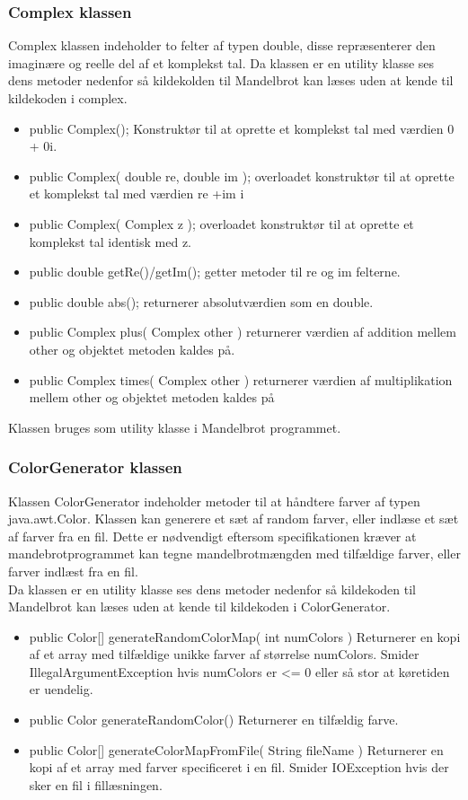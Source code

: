 \subsubsection{Complex klassen}
Complex klassen indeholder to felter af typen double, disse repræsenterer den imaginære og reelle del af et komplekst tal.
Da klassen er en utility klasse ses dens metoder nedenfor så kildekolden til Mandelbrot kan læses uden at kende til kildekoden i complex.
\begin{itemize}
    \item public Complex(); Konstruktør til at oprette et komplekst tal med værdien 0 + 0i.
    \item public Complex( double re, double im ); overloadet konstruktør til at oprette et komplekst tal med værdien re +im i
    \item public Complex( Complex z ); overloadet konstruktør til at oprette et komplekst tal identisk med z.
    \item public double getRe()/getIm(); getter metoder til re og im felterne.
    \item public double abs(); returnerer absolutværdien som en double.
    \item public Complex plus( Complex other ) returnerer værdien af addition mellem other og objektet metoden kaldes på.
    \item public Complex times( Complex other ) returnerer værdien af multiplikation mellem other og objektet metoden kaldes på
\end{itemize}
Klassen bruges som utility klasse i Mandelbrot programmet.

\subsubsection{ColorGenerator klassen}
Klassen ColorGenerator indeholder metoder til at håndtere farver af typen java.awt.Color. Klassen kan generere et
sæt af random farver, eller indlæse et sæt af farver fra en fil. Dette er nødvendigt eftersom specifikationen kræver
at mandebrotprogrammet kan tegne mandelbrotmængden med tilfældige farver, eller farver indlæst fra en fil. \\


Da klassen er en utility klasse ses dens metoder nedenfor så kildekoden til Mandelbrot kan læses uden at kende til kildekoden i ColorGenerator.
\begin{itemize}
    \item public Color[] generateRandomColorMap( int numColors ) Returnerer en kopi af et array med tilfældige unikke farver af størrelse numColors. Smider IllegalArgumentException hvis numColors er \textless = 0 eller så stor at køretiden er uendelig. 
    \item public Color generateRandomColor() Returnerer en tilfældig farve.
    \item public Color[] generateColorMapFromFile( String fileName ) Returnerer en kopi af et array med farver specificeret i en fil. Smider IOException hvis der sker en fil i fillæsningen.
\end{itemize}

